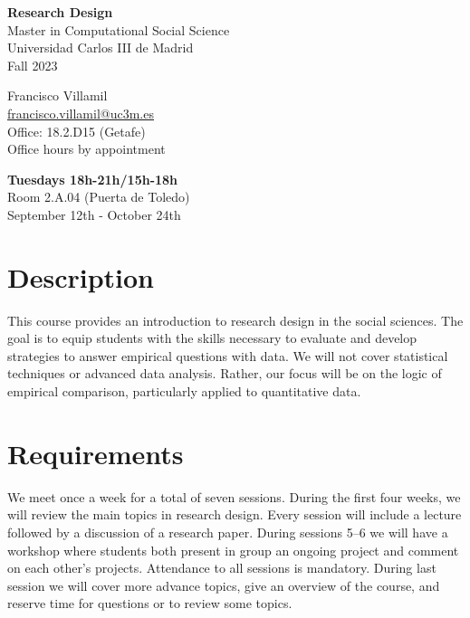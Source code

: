 \documentclass[12pt, a4paper]{article}
\begin{document}
\begin{center}
{\LARGE\bf Research Design}\\\vspace{10pt}
Master in Computational Social Science\\
Universidad Carlos III de Madrid\\\vspace{10pt}
{\large Fall 2023}\\
\end{center}

\vspace{20pt}

\begin{minipage}{0.49\textwidth}
\centering
Francisco Villamil\\
\href{francisco.villamil@uc3m.es}{francisco.villamil@uc3m.es}\\
Office: 18.2.D15 (Getafe)\\
Office hours by appointment
\end{minipage}\hfill
\begin{minipage}{0.49\textwidth}
\centering
\textbf{Tuesdays 18h-21h/15h-18h}\\Room 2.A.04 (Puerta de Toledo)\\September 12th - October 24th\\
\end{minipage}


\vspace{10pt}
\section{Description}

This course provides an introduction to research design in the social sciences.
The goal is to equip students with the skills necessary to evaluate and develop strategies to answer empirical questions with data.
We will not cover statistical techniques or advanced data analysis.
Rather, our focus will be on the logic of empirical comparison, particularly applied to quantitative data.

\section{Requirements}

We meet once a week for a total of seven sessions. During the first four weeks, we will review the main topics in research design. Every session will include a lecture followed by a discussion of a research paper. During sessions 5--6 we will have a workshop where students both present in group an ongoing project and comment on each other's projects. Attendance to all sessions is mandatory. During last session we will cover more advance topics, give an overview of the course, and reserve time for questions or to review some topics.
\end{document}
